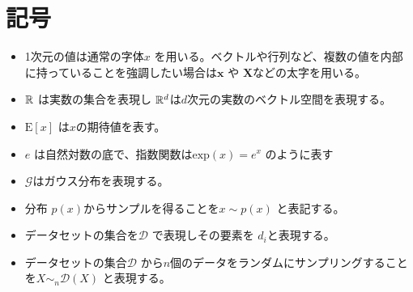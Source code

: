 \chapter*{記号}
\label{thanks}


\begin{itemize}
    \item 1次元の値は通常の字体$ x $ を用いる。ベクトルや行列など、複数の値を内部に持っていることを強調したい場合は$ \mathbf{x} $ や $ \mathbf{X} $などの太字を用いる。
    \item $\mathbb{R}$ は実数の集合を表現し $\mathbb{R}^d$は$ d $次元の実数のベクトル空間を表現する。 
    \item $\mathrm{E}[x]$ は$x$の期待値を表す。
    \item $e$ は自然対数の底で、指数関数は$\mathrm{exp}(x) = e^x$ のように表す
    \item $ \mathcal{G} $はガウス分布を表現する。
    \item 分布 $p(x)$からサンプルを得ることを$ x \sim p(x) $ と表記する。
    \item データセットの集合を$ \mathcal{D} $ で表現しその要素を $ d_i $と表現する。
    \item データセットの集合$ \mathcal{D} $ から$ n $個のデータをランダムにサンプリングすることを$ X \sim_n \mathcal{D}(X) $ と表現する。

\end{itemize}